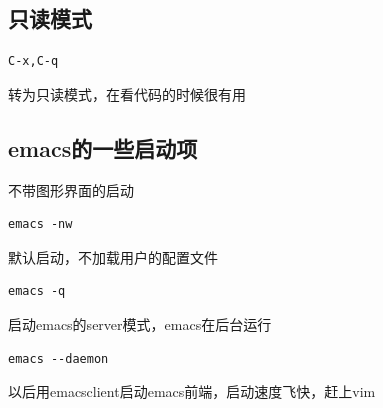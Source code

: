 \documentclass[adobefonts]{ctexart}
\begin{document}
\subsection{只读模式}
\begin{verbatim}
C-x,C-q
\end{verbatim}
转为只读模式，在看代码的时候很有用
\subsection{emacs的一些启动项}
不带图形界面的启动
\begin{verbatim}
emacs -nw
\end{verbatim}
默认启动，不加载用户的配置文件
\begin{verbatim}
emacs -q 
\end{verbatim}
启动emacs的server模式，emacs在后台运行
\begin{verbatim}
emacs --daemon
\end{verbatim}
以后用emacsclient启动emacs前端，启动速度飞快，赶上vim

\end{document}
